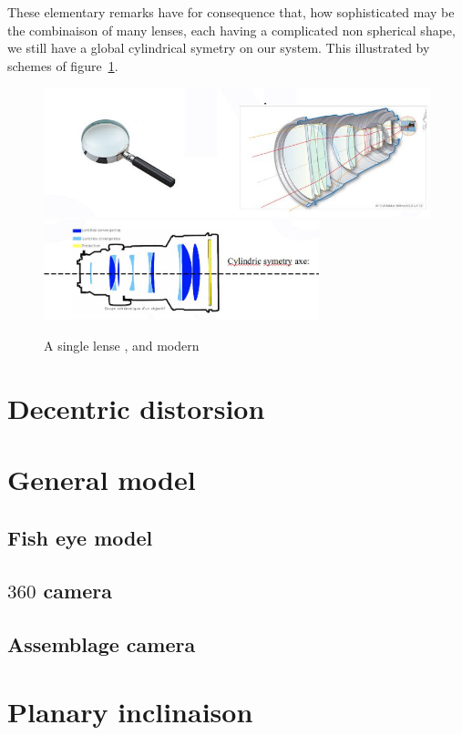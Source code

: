 These elementary remarks have for consequence that, how sophisticated may be the combinaison
of many lenses, each having a complicated non spherical shape, we still have a global cylindrical
symetry on our system. This illustrated by schemes of figure~\ref{fig:Lenses}.

\begin{figure}
\centering
	\includegraphics[width=12cm]{Methods/Images/Lenses.jpg} \\
	\includegraphics[width=8cm]{Methods/Images/LensesCyl.jpg}
	\caption{A single lense , and modern }
	\label{fig:Lenses}
\end{figure}




\section{Decentric distorsion}



\section{General model}

\subsection{Fish eye model}
\subsection{$360$ camera}
\subsection{Assemblage camera}


\section{Planary inclinaison}




